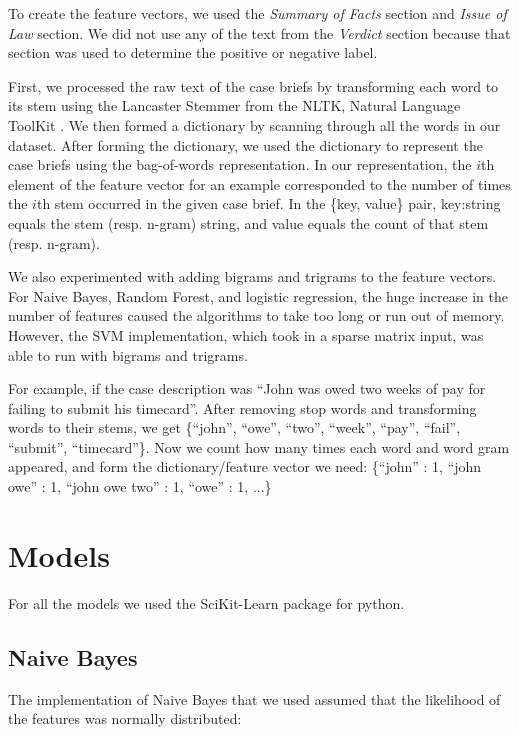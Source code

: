 \documentclass[journal]{IEEEtran}
\begin{document}
To create the feature vectors, we used the \textit{Summary of Facts} section and \textit{Issue of Law} section. We did not use any of the text from the \textit{Verdict} section because that section was used to determine the positive or negative label.

First, we processed the raw text of the case briefs by transforming each word to its stem using the Lancaster Stemmer from the NLTK, Natural Language ToolKit \cite{Loper:2002:NNL:1118108.1118117}. We then formed a dictionary by scanning through all the words in our dataset. After forming the dictionary, we used the dictionary to represent the case briefs using the bag-of-words representation. In our representation, the $i$th element of the feature vector for an example corresponded to the number of times the $i$th stem occurred in the given case brief. In the \{key, value\} pair, key:string equals the stem (resp. n-gram) string, and value equals the count of that stem (resp. n-gram).

We also experimented with adding bigrams and trigrams to the feature vectors. For Naive Bayes, Random Forest, and logistic regression, the huge increase in the number of features caused the algorithms to take too long or run out of memory. However, the SVM implementation, which took in a sparse matrix input, was able to run with bigrams and trigrams.

For example, if the case description was ``John was owed two weeks of pay for failing to submit his timecard''. After removing stop words and transforming words to their stems, we get \{``john'', ``owe'', ``two'', ``week'', ``pay'', ``fail'', ``submit'', ``timecard''\}. Now we count how many times each word and word gram appeared, and form the dictionary/feature vector we need: \{``john'' : 1, ``john owe'' : 1, ``john owe two'' : 1, ``owe'' : 1, ...\}

\section{Models}

For all the models we used the SciKit-Learn package \cite{scikit-learn} for python.

\subsection{Naive Bayes}

The implementation of Naive Bayes that we used assumed that the likelihood of the features was normally distributed:
\end{document}
